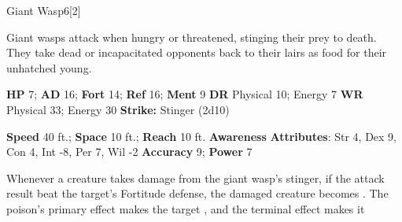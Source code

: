   \begin{monsection}{Giant Wasp}{6}[2]
    \vspace{-1em}\vspace{-1em}
    \vspace{0em}

    
      Giant wasps attack when hungry or threatened, stinging their prey to death.
      They take dead or incapacitated opponents back to their lairs as food for their unhatched young.
    

    \begin{spellcontent}
      \begin{spelltargetinginfo}
        \pari \textbf{HP} 7;
          \textbf{AD} 16;
          \textbf{Fort} 14;
          \textbf{Ref} 16;
          \textbf{Ment} 9
        \pari \textbf{DR} Physical 10; Energy 7
        \pari \textbf{WR} Physical 33; Energy 30
        \pari \textbf{Strike:}
            Stinger  (2d10)
      \end{spelltargetinginfo}
    \end{spellcontent}
    \begin{monsterfooter}
      \pari \textbf{Speed} 40 ft.;
        \textbf{Space} 10 ft.;
        \textbf{Reach} 10 ft.
      \pari \textbf{Awareness} 
      \pari \textbf{Attributes}:
        Str 4, Dex 9,
        Con 4, Int -8,
        Per 7, Wil -2
      \pari \textbf{Accuracy} 9;
        \textbf{Power} 7
    \end{monsterfooter}
  \end{monsection}
    Whenever a creature takes damage from the giant wasp's stinger,
      if the attack result beat the target's Fortitude defense,
      the damaged creature becomes .
    The poison's primary effect makes the target , and the terminal effect makes it 
  
